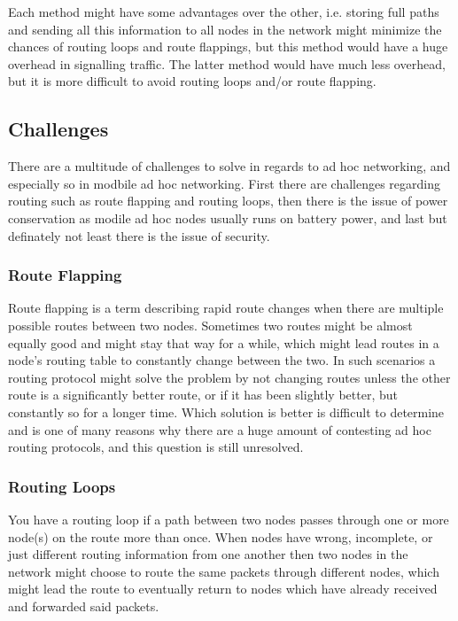 Each method might have some advantages over the other, i.e. storing full paths
and sending all this information to all nodes in the network might minimize the
chances of routing loops and route flappings, but this method would have a huge
overhead in signalling traffic. The latter method would have much less overhead,
but it is more difficult to avoid routing loops and/or route flapping.

\subsection{Challenges}
There are a multitude of challenges to solve in regards to ad hoc networking,
and especially so in modbile ad hoc networking. First there are challenges
regarding routing such as route flapping and routing loops, then there is the
issue of power conservation as modile ad hoc nodes usually runs on battery
power, and last but definately not least there is the issue of security.

\subsubsection*{Route Flapping}
Route flapping is a term describing rapid route changes when there are multiple
possible routes between two nodes. Sometimes two routes might be almost equally
good and might stay that way for a while, which might lead routes in a node's
routing table to constantly change between the two. In such scenarios a routing
protocol might solve the problem by not changing routes unless the other route
is a significantly better route, or if it has been slightly better, but
constantly so for a longer time. Which solution is better is difficult to
determine and is one of many reasons why there are a huge amount of contesting
ad hoc routing protocols, and this question is still unresolved.

\subsubsection*{Routing Loops}
You have a routing loop if a path between two nodes passes through one or more
node(s) on the route more than once. When nodes have wrong, incomplete, or just
different routing information from one another then two nodes in the network
might choose to route the same packets through different nodes, which might
lead the route to eventually return to nodes which have already received and
forwarded said packets.

